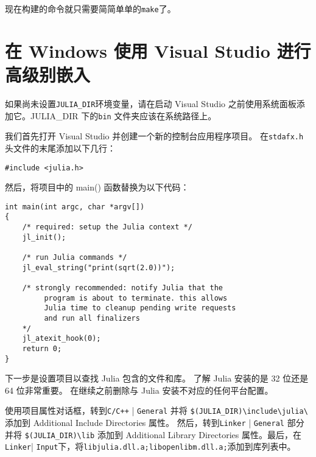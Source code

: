 现在构建的命令就只需要简简单单的\texttt{make}了。



\hypertarget{9091699375369199363}{}


\section{在 Windows 使用 Visual Studio 进行高级别嵌入}



如果尚未设置\texttt{JULIA\_DIR}环境变量，请在启动 Visual Studio 之前使用系统面板添加它。JULIA\_DIR 下的\texttt{bin} 文件夹应该在系统路径上。



我们首先打开 Visual Studio 并创建一个新的控制台应用程序项目。 在\texttt{stdafx.h}头文件的末尾添加以下几行：




\begin{lstlisting}
#include <julia.h>
\end{lstlisting}



然后，将项目中的 main() 函数替换为以下代码：




\begin{lstlisting}
int main(int argc, char *argv[])
{
    /* required: setup the Julia context */
    jl_init();

    /* run Julia commands */
    jl_eval_string("print(sqrt(2.0))");

    /* strongly recommended: notify Julia that the
         program is about to terminate. this allows
         Julia time to cleanup pending write requests
         and run all finalizers
    */
    jl_atexit_hook(0);
    return 0;
}
\end{lstlisting}



下一步是设置项目以查找 Julia 包含的文件和库。 了解 Julia 安装的是 32 位还是 64 位非常重要。 在继续之前删除与 Julia 安装不对应的任何平台配置。



使用项目属性对话框，转到\texttt{C/C++} | \texttt{General} 并将 \texttt{\$(JULIA\_DIR){\textbackslash}include{\textbackslash}julia{\textbackslash}} 添加到 Additional Include Directories 属性。 然后，转到\texttt{Linker} | \texttt{General} 部分并将 \texttt{\$(JULIA\_DIR){\textbackslash}lib} 添加到 Additional Library Directories 属性。最后，在\texttt{Linker}| \texttt{Input}下，将\texttt{libjulia.dll.a;libopenlibm.dll.a;}添加到库列表中。



